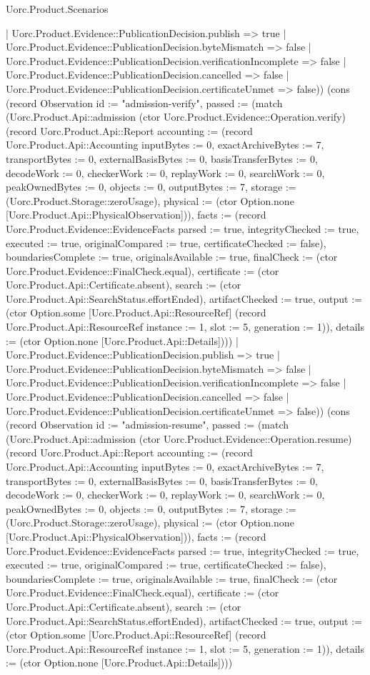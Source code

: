 \begin{lexlean}{Uorc.Product.Scenarios}
\begin{semanticmodule}
{{    | Uorc.Product.Evidence::PublicationDecision.publish => true
    | Uorc.Product.Evidence::PublicationDecision.byteMismatch => false
    | Uorc.Product.Evidence::PublicationDecision.verificationIncomplete => false
    | Uorc.Product.Evidence::PublicationDecision.cancelled => false
    | Uorc.Product.Evidence::PublicationDecision.certificateUnmet => false)}) (cons (record Observation {id := "admission-verify", passed := (match (Uorc.Product.Api::admission (ctor Uorc.Product.Evidence::Operation.verify) (record Uorc.Product.Api::Report {accounting := (record Uorc.Product.Api::Accounting {inputBytes := 0, exactArchiveBytes := 7, transportBytes := 0, externalBasisBytes := 0, basisTransferBytes := 0, decodeWork := 0, checkerWork := 0, replayWork := 0, searchWork := 0, peakOwnedBytes := 0, objects := 0, outputBytes := 7, storage := (Uorc.Product.Storage::zeroUsage), physical := (ctor Option.none [Uorc.Product.Api::PhysicalObservation])}), facts := (record Uorc.Product.Evidence::EvidenceFacts {parsed := true, integrityChecked := true, executed := true, originalCompared := true, certificateChecked := false}), boundariesComplete := true, originalsAvailable := true, finalCheck := (ctor Uorc.Product.Evidence::FinalCheck.equal), certificate := (ctor Uorc.Product.Api::Certificate.absent), search := (ctor Uorc.Product.Api::SearchStatus.effortEnded), artifactChecked := true, output := (ctor Option.some [Uorc.Product.Api::ResourceRef] (record Uorc.Product.Api::ResourceRef {instance := 1, slot := 5, generation := 1})), details := (ctor Option.none [Uorc.Product.Api::Details])}))
    | Uorc.Product.Evidence::PublicationDecision.publish => true
    | Uorc.Product.Evidence::PublicationDecision.byteMismatch => false
    | Uorc.Product.Evidence::PublicationDecision.verificationIncomplete => false
    | Uorc.Product.Evidence::PublicationDecision.cancelled => false
    | Uorc.Product.Evidence::PublicationDecision.certificateUnmet => false)}) (cons (record Observation {id := "admission-resume", passed := (match (Uorc.Product.Api::admission (ctor Uorc.Product.Evidence::Operation.resume) (record Uorc.Product.Api::Report {accounting := (record Uorc.Product.Api::Accounting {inputBytes := 0, exactArchiveBytes := 7, transportBytes := 0, externalBasisBytes := 0, basisTransferBytes := 0, decodeWork := 0, checkerWork := 0, replayWork := 0, searchWork := 0, peakOwnedBytes := 0, objects := 0, outputBytes := 7, storage := (Uorc.Product.Storage::zeroUsage), physical := (ctor Option.none [Uorc.Product.Api::PhysicalObservation])}), facts := (record Uorc.Product.Evidence::EvidenceFacts {parsed := true, integrityChecked := true, executed := true, originalCompared := true, certificateChecked := false}), boundariesComplete := true, originalsAvailable := true, finalCheck := (ctor Uorc.Product.Evidence::FinalCheck.equal), certificate := (ctor Uorc.Product.Api::Certificate.absent), search := (ctor Uorc.Product.Api::SearchStatus.effortEnded), artifactChecked := true, output := (ctor Option.some [Uorc.Product.Api::ResourceRef] (record Uorc.Product.Api::ResourceRef {instance := 1, slot := 5, generation := 1})), details := (ctor Option.none [Uorc.Product.Api::Details])}))
}}
\end{semanticmodule}
\end{lexlean}
